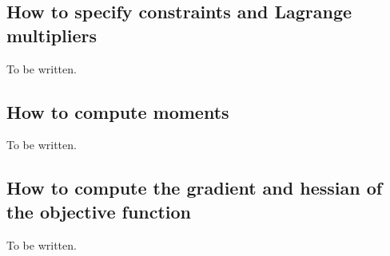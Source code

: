 \documentclass[12pt]{amsart}
\numberwithin{equation}{section}
\begin{document}
\subsection{How to specify constraints and Lagrange multipliers}
\label{sec:constraints}

To be written.

\subsection{How to compute moments}
\label{sec:quadrature}

To be written.

\subsection{How to compute the gradient and hessian of the objective function}
\label{sec:grad_hess}

To be written.
\end{document}
